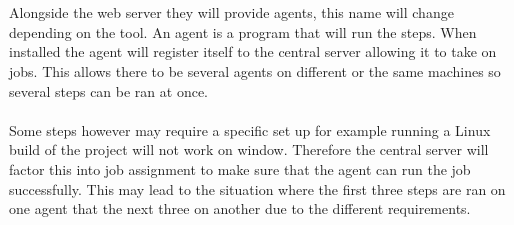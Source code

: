\\\\
Alongside the web server they will provide agents, this name will change depending on the tool. An agent is a program that will run the steps. When installed the agent will register itself to the central server allowing it to take on jobs. This allows there to be several agents on different or the same machines so several steps can be ran at once.
\\\\
Some steps however may require a specific set up for example running a Linux build of the project will not work on window. Therefore the central server will factor this into job assignment to make sure that the agent can run the job successfully. This may lead to the situation where the first three steps are ran on one agent that the next three on another due to the different requirements.